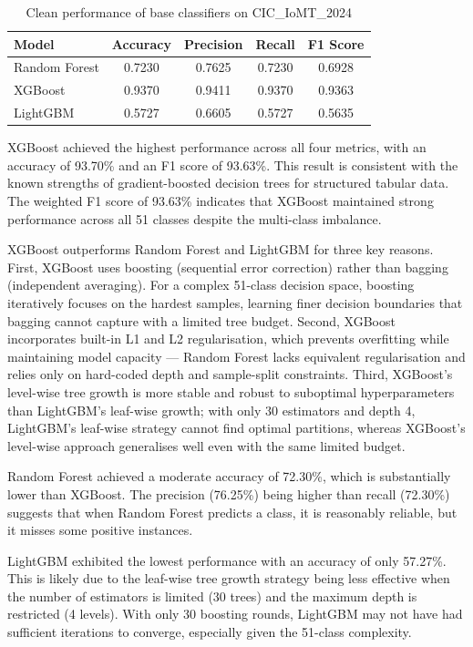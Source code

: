 \documentclass[12pt,a4paper,oneside]{report}
\begin{document}
\begin{table}[H]
    \centering
    \caption[Clean performance of base classifiers]{Clean performance of base classifiers on CIC\_IoMT\_2024}\label{tab:clean_performance}
    \begin{tabular}{lcccc}
        \toprule
        Model & Accuracy & Precision & Recall & F1 Score \\
        \midrule
        Random Forest & 0.7230 & 0.7625 & 0.7230 & 0.6928 \\
        XGBoost       & 0.9370 & 0.9411 & 0.9370 & 0.9363 \\
        LightGBM      & 0.5727 & 0.6605 & 0.5727 & 0.5635 \\
        \bottomrule
    \end{tabular}
\end{table}

XGBoost achieved the highest performance across all four metrics, with an accuracy of 93.70\% and an F1 score of 93.63\%. This result is consistent with the known strengths of gradient-boosted decision trees for structured tabular data. The weighted F1 score of 93.63\% indicates that XGBoost maintained strong performance across all 51 classes despite the multi-class imbalance.

XGBoost outperforms Random Forest and LightGBM for three key reasons. First, XGBoost uses boosting (sequential error correction) rather than bagging (independent averaging). For a complex 51-class decision space, boosting iteratively focuses on the hardest samples, learning finer decision boundaries that bagging cannot capture with a limited tree budget. Second, XGBoost incorporates built-in L1 and L2 regularisation, which prevents overfitting while maintaining model capacity --- Random Forest lacks equivalent regularisation and relies only on hard-coded depth and sample-split constraints. Third, XGBoost's level-wise tree growth is more stable and robust to suboptimal hyperparameters than LightGBM's leaf-wise growth; with only 30 estimators and depth 4, LightGBM's leaf-wise strategy cannot find optimal partitions, whereas XGBoost's level-wise approach generalises well even with the same limited budget.

Random Forest achieved a moderate accuracy of 72.30\%, which is substantially lower than XGBoost. The precision (76.25\%) being higher than recall (72.30\%) suggests that when Random Forest predicts a class, it is reasonably reliable, but it misses some positive instances.

LightGBM exhibited the lowest performance with an accuracy of only 57.27\%. This is likely due to the leaf-wise tree growth strategy being less effective when the number of estimators is limited (30 trees) and the maximum depth is restricted (4 levels). With only 30 boosting rounds, LightGBM may not have had sufficient iterations to converge, especially given the 51-class complexity.
\end{document}
